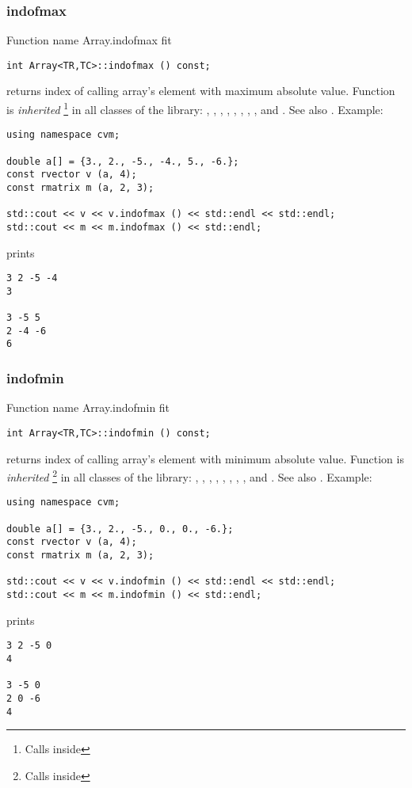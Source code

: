 \subsubsection{indofmax}
Function%
\pdfdest name {Array.indofmax} fit{}
\begin{Verbatim}
int Array<TR,TC>::indofmax () const;
\end{Verbatim}
returns \Based
index of calling array's element with maximum
absolute value.
Function is \emph{inherited}%
\footnote{Calls  inside}
in all classes of the library:
,   ,
,   ,
, ,
, ,
 and .
See also .
Example:
\begin{Verbatim}
using namespace cvm;

double a[] = {3., 2., -5., -4., 5., -6.};
const rvector v (a, 4);
const rmatrix m (a, 2, 3);

std::cout << v << v.indofmax () << std::endl << std::endl;
std::cout << m << m.indofmax () << std::endl;
\end{Verbatim}
prints
\begin{Verbatim}
3 2 -5 -4
3

3 -5 5
2 -4 -6
6
\end{Verbatim}
\newpage


\subsubsection{indofmin}
Function%
\pdfdest name {Array.indofmin} fit
\begin{Verbatim}
int Array<TR,TC>::indofmin () const;
\end{Verbatim}
returns  \Based
index of calling array's element with minimum
absolute value.
Function is \emph{inherited}%
\footnote{Calls  inside}
in all classes of the library:
,   ,
,   ,
, ,
, ,
 and .
See also .
Example:
\begin{Verbatim}
using namespace cvm;

double a[] = {3., 2., -5., 0., 0., -6.};
const rvector v (a, 4);
const rmatrix m (a, 2, 3);

std::cout << v << v.indofmin () << std::endl << std::endl;
std::cout << m << m.indofmin () << std::endl;
\end{Verbatim}
prints
\begin{Verbatim}
3 2 -5 0
4

3 -5 0
2 0 -6
4
\end{Verbatim}
\newpage


